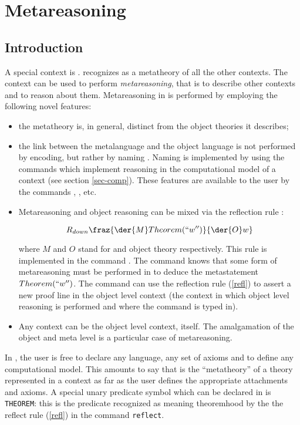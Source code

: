 \section{Metareasoning}
\label{sec-meta}

\subsection{Introduction}

A special context is {\meta}.
{\GF} recognizes {\meta} as a metatheory of all the other contexts.
The context {\meta} can be used to perform {\em metareasoning}, that is to
describe other contexts and to reason about them. 
Metareasoning in {\meta} is performed by employing the following novel
features:
%
\begin{itemize}
  \item
    the metatheory is, in general, distinct from the object theories it
    describes; 
  \item
    the link between the metalanguage and the object language is not performed
    by encoding, but rather by naming \cite{giunchiglia3}.
    Naming is implemented by using the commands which implement reasoning in
    the computational model of a context (see section \ref{sec-comp}).
    These features are available to the user by the commands ,
    ,  etc.  
  \item
    Metareasoning and object reasoning can be mixed via the reflection rule 
    \cite{giunchiglia3}:

    \begin{equation}
      R_{down}
      \fraz{\der{M} Theorem(``w'')}{\der{O} w}
      \label{refl}
    \end{equation}

    where $M$ and $O$ stand for {\meta} and object theory respectively. 
    This rule is implemented in the {\GF} command .
    The command knows that some form of metareasoning must be performed in
    {\meta} to deduce the metastatement $Theorem(``w'')$.
    The command can use the reflection rule (\ref{refl}) to assert a new proof
    line in the object level context (the context in which object level 
    reasoning is performed and where the command  is typed in).
  \item
    Any context can be the object level context, {\meta} itself.
    The amalgamation of the object and meta level is a particular case of {\GF}
    metareasoning. 
\end{itemize}

In {\meta}, the user is free to declare any language, any set of axioms and to 
define any computational model. This amounts to say that {\meta} is the 
``metatheory'' of a theory represented in a context as far as the user defines
the appropriate attachments and axioms.
A special unary predicate symbol which can be declared in {\meta} is
{\tt THEOREM}: this is the predicate recognized as meaning theoremhood by the
the reflect rule (\ref{refl}) in the command {\tt reflect}.

